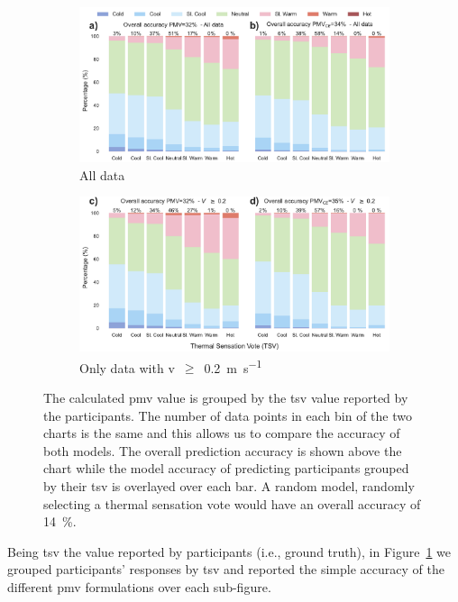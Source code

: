 \begin{figure}[htb!]
    \centering
    \begin{subfigure}[b]{\textwidth}
        \centering
        \includegraphics[width=\textwidth]{figures/bar_stacked_model_accuracy_0}
        \caption{All data}
     \end{subfigure}
    \begin{subfigure}[b]{\textwidth}
        \centering
        \includegraphics[width=\textwidth]{figures/bar_stacked_model_accuracy_0.2}
        \caption{Only data with \ac{v}~$\geq$~\qty{0.2}{\m\per\s}}
     \end{subfigure}
    \caption{The calculated \ac{pmv} value is grouped by the \ac{tsv} value reported by the participants. 
    The number of data points in each bin of the two charts is the same and this allows us to compare the accuracy of both models.
    The overall prediction accuracy is shown above the chart while the model accuracy of predicting participants grouped by their \ac{tsv} is overlayed over each bar. 
    A random model, randomly selecting a thermal sensation vote would have an overall accuracy of \qty{14}{\percent}.}
    \label{fig:bar_stacked_model_accuracy}
\end{figure}
Being \ac{tsv} the value reported by participants (i.e., ground truth), in Figure~\ref{fig:bar_stacked_model_accuracy} we grouped participants' responses by \ac{tsv} and reported the simple accuracy of the different \ac{pmv} formulations over each sub-figure.

